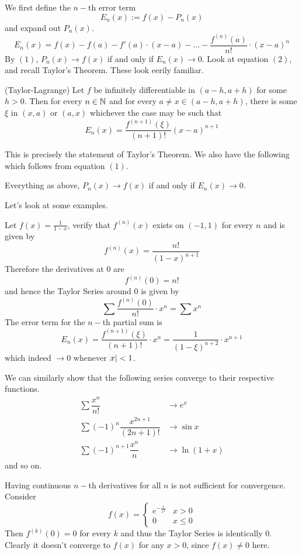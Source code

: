 We first define the $n-$th error term
\begin{equation}
E_n(x) := f(x) - P_n(x)
\end{equation}
and expand out $P_n(x)$.
\begin{equation}
E_n(x) = f(x) - f(a) - f'(a)\cdot (x - a) - \dots - \dfrac{f^{(n)}(a)}{n!}\cdot (x - a)^n
\end{equation}
By $(1)$, $P_n(x) \to f(x)$ if and only if $E_n(x) \to 0$. Look at equation $(2)$, and recall Taylor's Theorem. These look eerily familiar.
\begin{SNP}{\thm}(Taylor-Lagrange) Let $f$ be infinitely differentiable in $(a - h, a + h)$ for some $h > 0$. Then for every $n \in \mathbb{N}$ and for every $a\neq x \in (a - h, a + h)$, there is some $\xi$ in $(x, a)$ or $(a, x)$ whichever the case may be such that
$$
E_n(x) = \dfrac{f^{(n + 1)}(\xi)}{(n + 1)!}(x - a)^{n + 1}
$$ 
\end{SNP}
\newpage
This is precisely the statement of Taylor's Theorem. We also have the following which follows from equation $(1)$.
\begin{SNP}{\thm}Everything as above, $P_n(x) \to f(x)$ if and only if $E_n(x) \to 0$.
\end{SNP}
Let's look at some examples.
\begin{SNP}{\xmp}Let $f(x) = \frac{1}{1 - x}$, verify that $f^{(n)}(x)$ exists on $(-1, 1)$ for every $n$ and is given by
$$
f^{(n)}(x) = \dfrac{n!}{(1 - x)^{n + 1}}
$$
Therefore the derivatives at $0$ are
$$
f^{(n)}(0) = n!
$$
and hence the Taylor Series around $0$ is given by
$$
\sum \dfrac{f^{(n)}(0)}{n!}\cdot x^n = \sum x^n
$$
The error term for the $n-$th partial sum is
$$
E_n(x) = \dfrac{f^{(n + 1)}(\xi)}{(n + 1)!}\cdot x^n = \dfrac{1}{(1 - \xi)^{n + 2}}\cdot x^{n + 1}
$$
which indeed $\to 0$ whenever $\abs{x} < 1$.
\end{SNP}
We can similarly show that the following series converge to their respective functions.
\begin{align*}
\sum \dfrac{x^n}{n!} &\to e^x\\
\sum (-1)^n\dfrac{x^{2n + 1}}{(2n + 1)!} &\to \sin x\\
\sum (-1)^{n + 1}\dfrac{x^n}{n} &\to \ln (1 + x)
\end{align*}
and so on.

Having continuous $n-$th derivatives for all $n$ is not sufficient for convergence. Consider
$$
f(x) = \begin{cases}
e^{-\frac{1}{x^2}} & x > 0\\
0 & x\leq 0
\end{cases}
$$
Then $f^{(k)}(0) = 0$ for every $k$ and thus the Taylor Series is identically $0$. Clearly it doesn't converge to $f(x)$ for any $x > 0$, since $f(x) \neq 0$ here.
